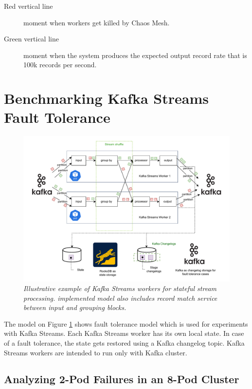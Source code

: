 \begin{description}
    \item[Red vertical line] moment when workers get killed by Chaos Mesh.
    \item[Green vertical line] moment when the system produces the expected output record rate that is
    100k records per second.
\end{description}


\section{Benchmarking Kafka Streams Fault Tolerance}\label{sec:benchmarking-kafka-streams-fault-tolerance}
\begin{figure}[H]
    \centering
    \includegraphics[width=1\textwidth]{figures/kafka/kafka-streams-workers}
    \caption{\textit{Illustrative example of Kafka Streams workers for stateful stream processing.
    implemented model also includes record match service between input and grouping blocks.}}
    \label{fig:kafka-streams-workers-general}
\end{figure}

The model on Figure \ref{fig:kafka-streams-workers-general} shows fault tolerance model which is used for
experiments with Kafka Streams.
Each Kafka Streams worker has its own local state.
In case of a fault tolerance, the state gets restored using a Kafka changelog topic.
Kafka Streams workers are intended to run only with Kafka cluster.

\newpage
\subsection{Analyzing 2-Pod Failures in an 8-Pod Cluster}\label{subsec:analyzing-2-pod-failures-in-an-8-pod-cluster}


